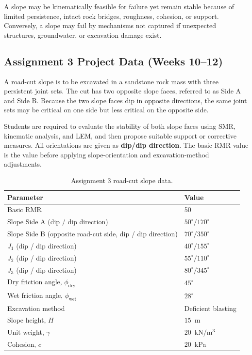 \documentclass[a4paper,12pt]{article}
\begin{document}
\begin{warnbox}
A slope may be kinematically feasible for failure yet remain stable because of limited persistence, intact rock bridges, roughness, cohesion, or support. Conversely, a slope may fail by mechanisms not captured if unexpected structures, groundwater, or excavation damage exist.
\end{warnbox}

\subsection{Assignment 3 Project Data (Weeks 10--12)}

A road-cut slope is to be excavated in a sandstone rock mass with three persistent joint sets. The cut has two opposite slope faces, referred to as Side A and Side B. Because the two slope faces dip in opposite directions, the same joint sets may be critical on one side but less critical on the opposite side.

Students are required to evaluate the stability of both slope faces using SMR, kinematic analysis, and LEM, and then propose suitable support or corrective measures. All orientations are given as \textbf{dip/dip direction}. The basic RMR value is the value before applying slope-orientation and excavation-method adjustments.

\begin{table}[h!]
\centering
\begin{tabular}{l l}
\toprule
\textbf{Parameter} & \textbf{Value} \\
\midrule
Basic RMR & 50 \\
Slope Side A (dip / dip direction) & $50^\circ / 170^\circ$ \\
Slope Side B (opposite road-cut side, dip / dip direction) & $70^\circ / 350^\circ$ \\
$J_1$ (dip / dip direction) & $40^\circ / 155^\circ$ \\
$J_2$ (dip / dip direction) & $55^\circ / 110^\circ$ \\
$J_3$ (dip / dip direction) & $80^\circ / 345^\circ$ \\
Dry friction angle, $\phi_{\mathrm{dry}}$ & $45^\circ$ \\
Wet friction angle, $\phi_{\mathrm{wet}}$ & $28^\circ$ \\
Excavation method & Deficient blasting \\
Slope height, $H$ & $15$~m \\
Unit weight, $\gamma$ & $20$~kN/m$^3$ \\
Cohesion, $c$ & $20$~kPa \\
\bottomrule
\end{tabular}
\caption{Assignment 3 road-cut slope data.}
\end{table}
\end{document}

